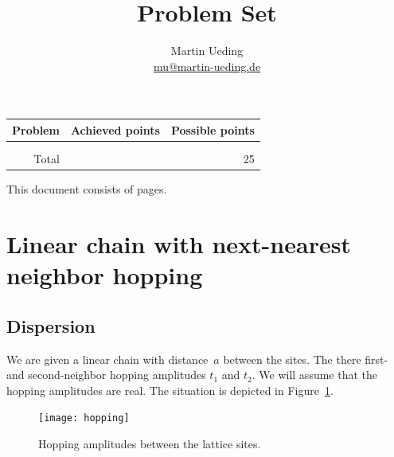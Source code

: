 \documentclass[11pt, english, fleqn, DIV=15, headinclude, BCOR=1cm]{scrartcl}
\title{Problem Set \arabic{problemset}}
\author{
    Martin Ueding \\ \small{\href{mailto:mu@martin-ueding.de}{mu@martin-ueding.de}}
}
\newcounter{totalpoints}
\begin{document}
\maketitle

\vspace{3ex}

\begin{center}
    \begin{tabular}{rrr}
        \toprule
        Problem & Achieved points & Possible points \\
        \midrule
        \nameref{homework:1} & & \\
        \nameref{homework:2} & & \\
        \midrule
        Total & & 25 \\
        \bottomrule
    \end{tabular}
\end{center}

\vspace{3ex}

\begin{center}
    \begin{small}
        This document consists of \pageref{LastPage} pages.
    \end{small}
\end{center}

\section{Linear chain with next-nearest neighbor hopping}
\label{homework:1}

\subsection{Dispersion}

We are given a linear chain with distance~$a$ between the sites. The there
first- and second-neighbor hopping amplitudes $t_1$ and $t_2$. We will assume
that the hopping amplitudes are real. The situation is depicted in
Figure~\ref{fig:hopping}.

\begin{figure}
    \centering
    \texttt{[image: hopping]}
    \caption{%
        Hopping amplitudes between the lattice sites.
    }
    \label{fig:hopping}
\end{figure}
\end{document}
